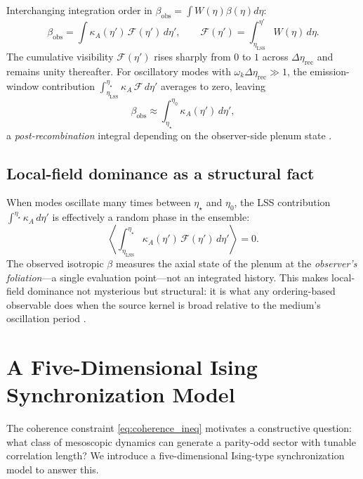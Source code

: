 \documentclass[12pt]{article}
\theoremstyle{definition}
\newcommand{\kA}{\kappa_A}
\newcommand{\Wrec}{\Delta\eta_{\mathrm{rec}}}
\newcommand{\betaobs}{\beta_{\mathrm{obs}}}
\newcommand{\etaLSS}{\eta_{\mathrm{LSS}}}
\newcommand{\etastar}{\eta_\star}
\newcommand{\etaobs}{\eta_0}
\begin{document}
Interchanging integration order in $\betaobs=\int W(\eta)\beta(\eta)d\eta$:
\begin{equation}
  \betaobs
  = \int\kA(\eta')\,\mathcal{F}(\eta')\,d\eta',
  \qquad
  \mathcal{F}(\eta') = \int_{\etaLSS}^{\eta'} W(\eta)\,d\eta.
  \label{eq:boundary_deriv}
\end{equation}
The cumulative visibility $\mathcal{F}(\eta')$ rises sharply from
$0$ to $1$ across $\Wrec$ and remains unity thereafter.
For oscillatory modes with $\omega_k\Wrec\gg1$, the emission-window
contribution $\int_{\etaLSS}^{\etastar}\kA\,\mathcal{F}\,d\eta'$ averages to
zero, leaving
\begin{equation}
  \betaobs \approx \int_{\etastar}^{\etaobs}\kA(\eta')\,d\eta',
  \label{eq:boundary_result}
\end{equation}
a \emph{post-recombination} integral depending on the observer-side
plenum state \cite{Fujita2021,Murai2023}.

\subsection{Local-field dominance as a structural fact}

When modes oscillate many times between $\etastar$ and $\etaobs$,
the LSS contribution $\int^{\etastar}\kA\,d\eta'$ is effectively a random
phase in the ensemble:
\begin{equation}
  \left\langle\int_{\etaLSS}^{\etastar}
    \kA(\eta')\,\mathcal{F}(\eta')\,d\eta'\right\rangle = 0.
\end{equation}
The observed isotropic $\beta$ measures the axial state of the plenum
at the \emph{observer's foliation}---a single evaluation point---not
an integrated history.
This makes local-field dominance not mysterious but structural:
it is what any ordering-based observable does when the source kernel
is broad relative to the medium's oscillation period
\cite{Zaldarriaga1998,Sherfield2023}.

\section{A Five-Dimensional Ising Synchronization Model}
\label{sec:synchronization}

The coherence constraint \eqref{eq:coherence_ineq} motivates a
constructive question: what class of mesoscopic dynamics can generate
a parity-odd sector with tunable correlation length?
We introduce a five-dimensional Ising-type synchronization model
to answer this.
\end{document}
